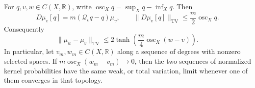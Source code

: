 \begin{proposition}\label{prop:normalized-kernel-weight-stability}
For $q,v,w\in C(X,\mathbb R)$, write $\operatorname{osc}_Xq=\sup_Xq-\inf_Xq$. Then
\begin{equation}\label{eq:normalized-kernel-response-bound}
 D\mu_v[q]=m(\mathcal Q_vq-q)\mu_v,
 \qquad
 \|D\mu_v[q]\|_{\mathrm{TV}}
       \leq\frac m2\operatorname{osc}_Xq.
\end{equation}
Consequently
\begin{equation}\label{eq:normalized-kernel-weight-stability}
 \|\mu_w-\mu_v\|_{\mathrm{TV}}
 \leq2\tanh\left(\frac m4\operatorname{osc}_X(w-v)\right).
\end{equation}
In particular, let $v_m,w_m\in C(X,\mathbb R)$ along a sequence of degrees with nonzero selected spaces. If $m\operatorname{osc}_X(w_m-v_m)\to0$, then the two sequences of normalized kernel probabilities have the same weak, or total variation, limit whenever one of them converges in that topology.
\end{proposition}
